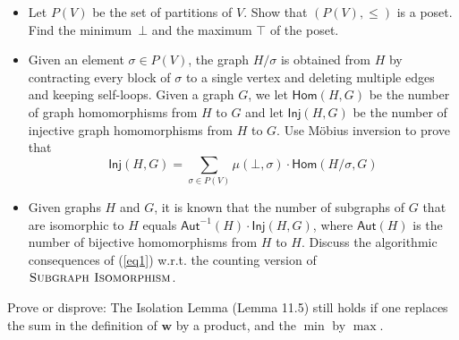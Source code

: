 \begin{exercise}
\begin{enumerate}
\begin{itemize}
\item Let $P(V)$ be the set of partitions of $V$. Show that $(P(V),\leq)$ is a poset. Find the minimum~$\bot$ and the maximum $\top$ of the poset.
\item Given an element $\sigma \in P(V)$, the graph $H/\sigma$ is obtained from $H$ by contracting every block of $\sigma$ to a single vertex and deleting multiple edges and keeping self-loops. Given a graph $G$, we let $\mathsf{Hom}(H,G)$ be the number of graph homomorphisms from $H$ to $G$ and let $\mathsf{Inj}(H,G)$ be the number of injective graph homomorphisms from $H$ to $G$. Use Möbius inversion to prove that 
\begin{equation}\label{eq1}
\mathsf{Inj}(H,G) = \sum_{\sigma \in P(V)} \mu(\bot,\sigma)\cdot \mathsf{Hom}(H/\sigma,G) 
\end{equation}
\item Given graphs $H$ and $G$, it is known that the number of subgraphs of $G$ that are isomorphic to $H$ equals $\mathsf{Aut}^{-1}(H)\cdot \mathsf{Inj}(H,G)$, where $\mathsf{Aut}(H)$ is the number of bijective homomorphisms from $H$ to $H$. Discuss the algorithmic consequences of (\ref{eq1}) w.r.t. the counting version of $\textsc{Subgraph Isomorphism}$.
\end{itemize}
\end{enumerate}
\end{exercise}

\begin{exercise}
Prove or disprove:
The Isolation Lemma (Lemma 11.5) still holds if one replaces the sum in the definition of $\textbf{w}$ by a product,
and the $\min$ by $\max$.
\end{exercise}

